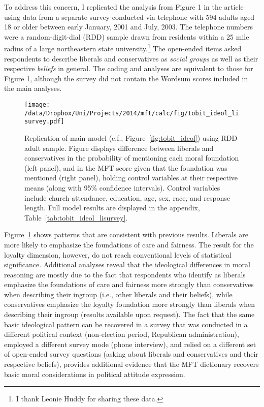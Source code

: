 To address this concern, I replicated the analysis from Figure 1 in the article using data from a separate survey conducted via telephone with 594 adults aged 18 or older between early January, 2001 and July, 2003. The telephone numbers were a random-digit-dial (RDD) sample drawn from residents within a 25 mile radius of a large northeastern state university.\footnote{I thank Leonie Huddy for sharing these data.} The open-ended items asked respondents to describe liberals and conservatives as \textit{social groups} as well as their respective \textit{beliefs} in general. The coding and analyses are equivalent to those for Figure 1, although the survey did not contain the Wordsum scores included in the main analyses.

\begin{figure}[ht]\centering
\texttt{[image: /data/Dropbox/Uni/Projects/2014/mft/calc/fig/tobit\_ideol\_lisurvey.pdf]}
\caption[Replication of main model predicting MFT scores based on ideology using RDD adult sample]{Replication of main model (c.f., Figure~\ref{fig:tobit_ideol}) using RDD adult sample. Figure displays difference between liberals and conservatives in the probability of mentioning each moral foundation (left panel), and in the MFT score given that the foundation was mentioned (right panel), holding control variables at their respective means (along with 95\% confidence intervals). Control variables include church attendance, education, age, sex, race, and response length. Full model results are displayed in the appendix, Table~\ref{tab:tobit_ideol_lisurvey}.
}\label{fig:tobit_ideol_lisurvey}
\end{figure}

Figure~\ref{fig:tobit_ideol_lisurvey} shows patterns that are consistent with previous results. Liberals are more likely to emphasize the foundations of care and fairness. The result for the loyalty dimension, however, do not reach conventional levels of statistical significance. Additional analyses reveal that the ideological differences in moral reasoning are mostly due to the fact that respondents who identify as liberals emphasize the foundations of care and fairness more strongly than conservatives when describing their ingroup (i.e., other liberals and their beliefs), while conservatives emphasize the loyalty foundation more strongly than liberals when describing their ingroup (results available upon request). The fact that the same basic ideological pattern can be recovered in a survey that was conducted in a different political context (non-election period, Republican administration), employed a different survey mode (phone interview), and relied on a different set of open-ended survey questions (asking about liberals and conservatives and their respective beliefs), provides additional evidence that the MFT dictionary recovers basic moral considerations in political attitude expression.


